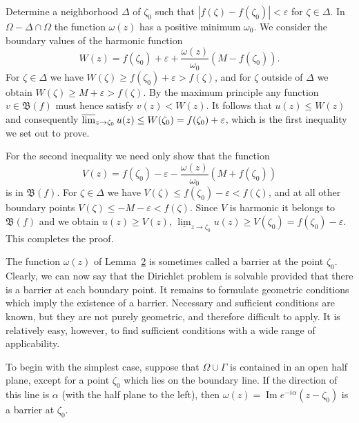 Determine a neighborhood $\Delta$ of $\zeta_0$ such that $|f(\zeta) - f(\zeta_0)| < \varepsilon$ for $\zeta \in \Delta$. In $\Omega - \Delta \cap \Omega$ the function $\omega(z)$ has a positive minimum $\omega_0$. We consider the boundary values of the harmonic function
\begin{equation*}
W (z) = f (\zeta_ {0}) + \varepsilon + \frac {\omega (z)}{\omega_ {0}} (M - f (\zeta_ {0})).
\end{equation*}
For $\zeta \in \Delta$ we have $W(\zeta) \geq f(\zeta_0) + \varepsilon > f(\zeta)$, and for $\zeta$ outside of $\Delta$ we obtain $W(\zeta) \geq M + \varepsilon > f(\zeta)$. By the maximum principle any function $v \in \mathfrak{B}(f)$ must hence satisfy $v(z) < W(z)$. It follows that $u(z) \leq W(z)$ and consequently $\varlimsup_{z \to \zeta_0} u(z) \leq W(\zeta_0) = f(\zeta_0) + \varepsilon$, which is the first inequality we set out to prove.

For the second inequality we need only show that the function
\begin{equation*}
V (z) = f (\zeta_ {0}) - \varepsilon - \frac {\omega (z)}{\omega_ {0}} (M + f (\zeta_ {0}))
\end{equation*}
is in $\mathfrak{B}(f)$. For $\zeta \in \Delta$ we have $V(\zeta) \leq f(\zeta_0) - \varepsilon < f(\zeta)$, and at all other boundary points $V(\zeta) \leq -M - \varepsilon < f(\zeta)$. Since $V$ is harmonic it belongs to $\mathfrak{B}(f)$ and we obtain $u(z) \geq V(z)$, $\underline{\lim}_{z \to \zeta_0} u(z) \geq V(\zeta_0) = f(\zeta_0) - \varepsilon$. This completes the proof.

The function $\omega(z)$ of Lemma~\hyperref[lem:6.2]{2} is sometimes called a barrier at the point $\zeta_{0}$. Clearly, we can now say that the Dirichlet problem is solvable provided that there is a barrier at each boundary point. It remains to formulate geometric conditions which imply the existence of a barrier. Necessary and sufficient conditions are known, but they are not purely geometric, and therefore difficult to apply. It is relatively easy, however, to find sufficient conditions with a wide range of applicability.


To begin with the simplest case, suppose that $\Omega \cup \Gamma$ is contained in an open half plane, except for a point $\zeta_0$ which lies on the boundary line. If the direction of this line is $\alpha$ (with the half plane to the left), then $\omega(z) = \operatorname{Im} e^{-i\alpha}(z - \zeta_0)$ is a barrier at $\zeta_0$.

